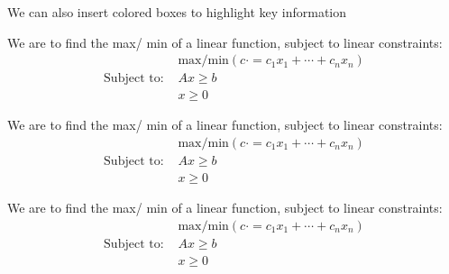 We can also insert colored boxes to highlight key information

\begin{myboxb}
    \begin{definition}
       We are to find the max/ min of a linear function, subject to linear constraints:
       \begin{align}
           & \text{max/min}(c \cdot = c_1x_1 + \cdots + c_n x_n) \\
           \text{Subject to: } & Ax \geq b \\
           & x \geq 0
       \end{align}
    \end{definition}
\end{myboxb}

\begin{myboxg}
    \begin{definition}
       We are to find the max/ min of a linear function, subject to linear constraints:
       \begin{align}
           & \text{max/min}(c \cdot = c_1x_1 + \cdots + c_n x_n) \\
           \text{Subject to: } & Ax \geq b \\
           & x \geq 0
       \end{align}
    \end{definition}
\end{myboxg}

\begin{myboxr}
    \begin{definition}
       We are to find the max/ min of a linear function, subject to linear constraints:
       \begin{align}
           & \text{max/min}(c \cdot = c_1x_1 + \cdots + c_n x_n) \\
           \text{Subject to: } & Ax \geq b \\
           & x \geq 0
       \end{align}
    \end{definition}
\end{myboxr}



